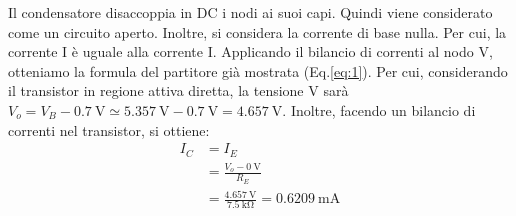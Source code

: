 Il condensatore disaccoppia in DC i nodi ai suoi capi. Quindi viene considerato come un circuito aperto. Inoltre, si considera la corrente di base nulla. Per cui, la corrente I è uguale alla corrente I. Applicando il bilancio di correnti al nodo V, otteniamo la formula del partitore già mostrata (Eq.\ref{eq:1}). Per cui, considerando il transistor in regione attiva diretta, la tensione V sarà $V_o=V_B-\SI{0.7}{\volt}\simeq\SI{5.357}{\volt}-\SI{0.7}{\volt}=\SI{4.657}{\volt}$. Inoltre, facendo un bilancio di correnti nel transistor, si ottiene:
\begin{equation}
	\begin{split}
		I_C&=I_E \\
		&=\frac{V_o-\SI{0}{\volt}}{R_E} \\
		&=\frac{\SI{4.657}{\volt}}{\SI{7.5}{\kilo\ohm}}=\SI{0.6209}{\milli\ampere}
	\end{split}
\end{equation}






